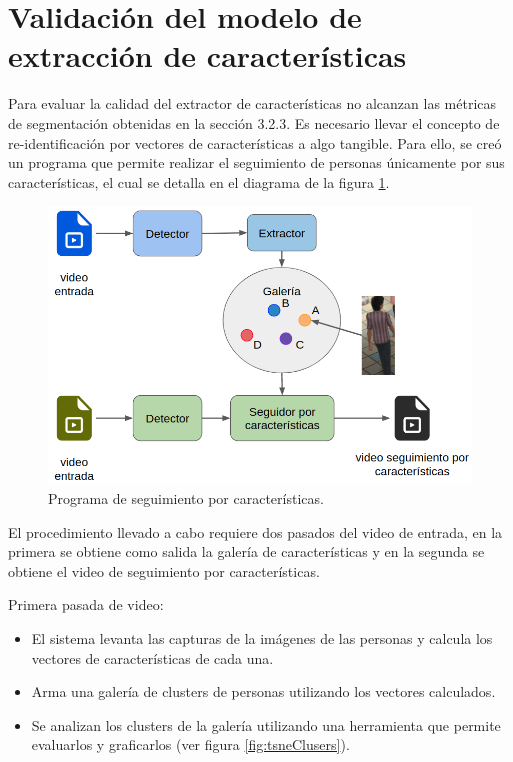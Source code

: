 \section{Validación del modelo de extracción de características}
\label{sec:validExtractor}

Para evaluar la calidad del extractor de características no alcanzan las métricas de segmentación obtenidas en la sección 3.2.3. Es necesario llevar el concepto de re-identificación por vectores de características a algo tangible. Para ello, se creó un programa que permite realizar el seguimiento de personas únicamente por sus características, el cual se detalla en el diagrama de la figura \ref{fig:seguidorPorCaracteristicas}.

\begin{figure}[ht]
	\centering
	\includegraphics[scale=.60]{./Figures/seguidorPorCaracteristicas.png}
	\caption{Programa de seguimiento por características.}
	\label{fig:seguidorPorCaracteristicas}
\end{figure}

\newpage

El procedimiento llevado a cabo requiere dos pasados del video de entrada, en la primera se obtiene como salida la galería de características y en la segunda se obtiene el video de seguimiento por características.

Primera pasada de video:
\begin{itemize}
\item El sistema levanta las capturas de la imágenes de las personas y calcula los vectores de características de cada una.
\item Arma una galería de clusters de personas utilizando los vectores calculados.
\item Se analizan los clusters de la galería utilizando una herramienta que permite evaluarlos y graficarlos (ver figura \ref{fig:tsneClusers}).
\end{itemize}

